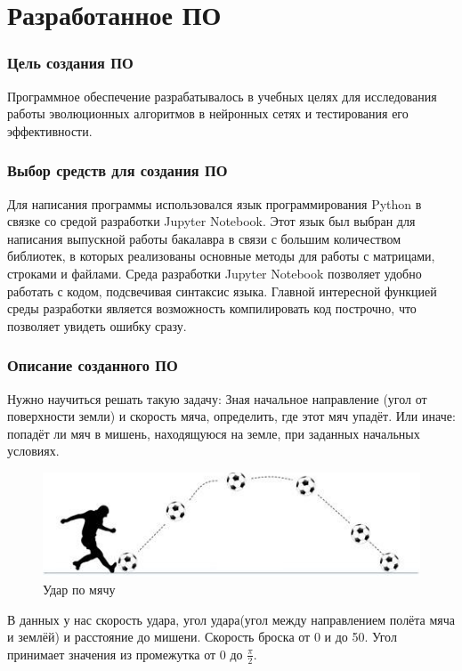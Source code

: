 \newpage

\chapter{Разработанное ПО}

\subsection{Цель создания ПО}
Программное обеспечение разрабатывалось в учебных целях для исследования работы эволюционных алгоритмов в нейронных сетях и тестирования его эффективности.

\subsection{Выбор средств для создания ПО}

Для написания программы использовался язык программирования Python в связке со средой разработки Jupyter Notebook. Этот язык был выбран для написания выпускной работы бакалавра в связи с большим количеством библиотек, в которых реализованы основные методы для работы с матрицами, строками и файлами.
Среда разработки Jupyter Notebook позволяет удобно работать с кодом, подсвечивая синтаксис языка. Главной интересной функцией среды разработки является возможность компилировать код построчно, что позволяет увидеть ошибку сразу. 

\subsection{Описание созданного ПО}

Нужно научиться решать такую задачу:
Зная начальное направление (угол от поверхности земли) и скорость мяча, определить, где этот мяч упадёт. Или иначе: попадёт ли мяч в мишень, находящуюся на земле, при заданных начальных условиях.

\begin{figure}[h]
  \centering
  \includegraphics[width=0.5\linewidth]{./img/footbal}
  \caption{Удар по мячу}
  \label{fig:mpr} 
\end{figure} 

В данных у нас скорость удара, угол удара(угол между направлением полёта мяча и землёй) и расстояние до мишени. Скорость броска от 0 и до 50. Угол принимает значения из промежутка от 0 до $\frac{\pi}{2}$. 

